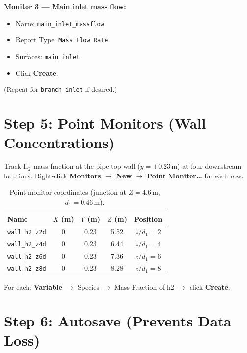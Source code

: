 \documentclass[12pt,a4paper]{report}
\begin{document}
\noindent\textbf{Monitor 3 --- Main inlet mass flow:}
\begin{itemize}
  \item Name: \texttt{main\_inlet\_massflow}
  \item Report Type: \texttt{Mass Flow Rate}
  \item Surfaces: \texttt{main\_inlet}
  \item Click \textbf{Create}.
\end{itemize}

\noindent(Repeat for \texttt{branch\_inlet} if desired.)

\section{Step 5: Point Monitors (Wall Concentrations)}

Track H$_2$ mass fraction at the pipe-top wall ($y = +0.23$\,m) at
four downstream locations.  Right-click \textbf{Monitors} $\rightarrow$
\textbf{New} $\rightarrow$ \textbf{Point Monitor\ldots} for each row:

\begin{table}[H]
\centering
\caption{Point monitor coordinates (junction at $Z = 4.6$\,m,
         $d_1 = 0.46$\,m).}
\label{tab:pointmon}
\begin{tabular}{@{}lcccc@{}}
\toprule
\textbf{Name} & $X$ (m) & $Y$ (m) & $Z$ (m) & \textbf{Position} \\
\midrule
\texttt{wall\_h2\_z2d} & 0 & 0.23 & 5.52 & $z/d_1 = 2$ \\
\texttt{wall\_h2\_z4d} & 0 & 0.23 & 6.44 & $z/d_1 = 4$ \\
\texttt{wall\_h2\_z6d} & 0 & 0.23 & 7.36 & $z/d_1 = 6$ \\
\texttt{wall\_h2\_z8d} & 0 & 0.23 & 8.28 & $z/d_1 = 8$ \\
\bottomrule
\end{tabular}
\end{table}

\noindent For each: \textbf{Variable} $\rightarrow$ Species
$\rightarrow$ Mass Fraction of h2 $\rightarrow$ click \textbf{Create}.

\section{Step 6: Autosave (Prevents Data Loss)}
\end{document}
